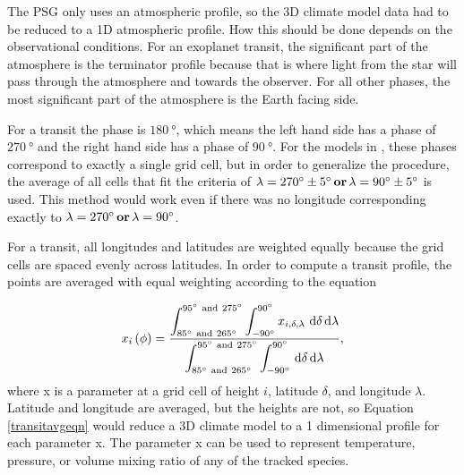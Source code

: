 The PSG only uses an atmospheric profile, so the 3D climate model
 data had to be reduced to a 1D atmospheric profile. How this
 should be done depends on the observational conditions. For an exoplanet
 transit, the significant part of the atmosphere is the
 terminator profile because that is where light from the star will pass through
 the atmosphere and towards the observer. For all other phases, the most
 significant part of the atmosphere is the Earth facing side.

For a transit the phase is $\SI{180}{\degree}$, which means the left hand
 side has a phase of $\SI{270}{\degree}$ and the right hand side has a phase of
 $\SI{90}{\degree}$. For the models in \citet{wolf18}, these phases
 correspond to exactly a single grid cell, but in order to generalize the
 procedure, the average of all cells that fit the criteria of
 $\lambda=\SI{270}{\degree}\pm\SI{5}{\degree} \,\mathrm{\bf{or}}\,
 \lambda=\SI{90}{\degree}\pm\SI{5}{\degree}$ is used. This method would work even if
 there was no longitude corresponding exactly to
 $\lambda=\SI{270}{\degree} \,\mathrm{\bf{or}}\, \lambda=\SI{90}{\degree}$.

For a transit, all longitudes and latitudes are weighted equally because the
 grid cells are spaced evenly across latitudes. In order to compute a transit
 profile, the points are averaged with equal weighting according to the equation

\begin{equation}
    x_i\left(\phi\right)=
    \ddfrac{
        \int_{\SIlist{85;265}{\degree}}^{\SIlist{95;275}{\degree}}
        \int_{\SI{-90}{\degree}}^{\SI{90}{\degree}}
        x_{i,\delta,\lambda}
        \,\dif \delta\dif \lambda
    }
        {\int_{\SIlist{85;265}{\degree}}^{\SIlist{95;275}{\degree}}
        \int_{\SI{-90}{\degree}}^{\SI{90}{\degree}}
        \,\dif \delta \dif \lambda
    },
    \label{transitavgeqn}
\end{equation}
where x is a parameter at a grid cell of height $i$, latitude $\delta$, and
 longitude $\lambda$. Latitude and longitude are averaged, but the heights are
 not, so Equation \ref{transitavgeqn} would reduce a 3D climate model to a 1
 dimensional profile for each parameter x. The parameter x can be used to
 represent temperature, pressure, or volume mixing ratio of any of the tracked
 species.

